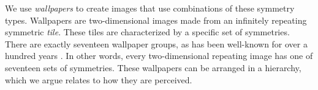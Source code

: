 We use \emph{wallpapers} to create images that use combinations of these symmetry types. Wallpapers are two-dimensional images made from an infinitely repeating symmetric \textit{tile}. These tiles are characterized by a specific set of symmetries. There are exactly seventeen wallpaper groups, as has been well-known for over a hundred years \citep{wallpaper-proof}. In other words, every two-dimensional repeating image has one of seventeen sets of symmetries. These wallpapers can be arranged in a hierarchy, which we argue relates to how they are perceived.